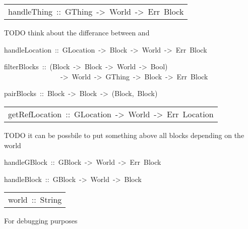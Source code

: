 \begin{haddockdesc}
\item[\begin{tabular}{@{}l}
handleThing\ ::\ GThing\ ->\ World\ ->\ Err\ {\char 91}Block{\char 93}
\end{tabular}]\haddockbegindoc
TODO think about the differance between  and   
\par

\end{haddockdesc}
\begin{haddockdesc}
\item[
handleLocation\ ::\ GLocation\ ->\ {\char 91}Block{\char 93}\ ->\ World\ ->\ Err\ {\char 91}Block{\char 93}
]
\item[
filterBlocks\ ::\ (Block\ ->\ Block\ ->\ World\ ->\ Bool)\\\ \ \ \ \ \ \ \ \ \ \ \ \ \ \ \ ->\ World\ ->\ GThing\ ->\ {\char 91}Block{\char 93}\ ->\ Err\ {\char 91}Block{\char 93}
]
\item[
pairBlocks\ ::\ {\char 91}Block{\char 93}\ ->\ {\char 91}Block{\char 93}\ ->\ {\char 91}(Block,\ Block){\char 93}
]
\end{haddockdesc}
\begin{haddockdesc}
\item[\begin{tabular}{@{}l}
getRefLocation\ ::\ GLocation\ ->\ World\ ->\ Err\ Location
\end{tabular}]\haddockbegindoc
TODO it can be possbile to put something above all blocks depending on the world 
\par

\end{haddockdesc}
\begin{haddockdesc}
\item[
handleGBlock\ ::\ GBlock\ ->\ World\ ->\ Err\ {\char 91}Block{\char 93}
]
\item[
handleBlock\ ::\ GBlock\ ->\ World\ ->\ {\char 91}Block{\char 93}
]
\end{haddockdesc}
\begin{haddockdesc}
\item[\begin{tabular}{@{}l}
world\ ::\ {\char 91}{\char 91}String{\char 93}{\char 93}
\end{tabular}]\haddockbegindoc
For debugging purposes 
\par

\end{haddockdesc}